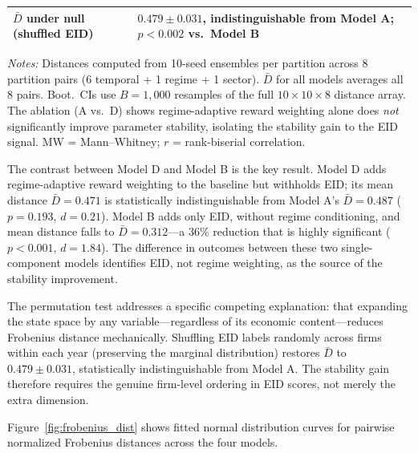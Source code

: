 \documentclass[12pt]{article}
\begin{document}
\begin{table}[t]
\begin{tabular}{lcccc}
\hspace{4pt}$\bar{D}$ under null (shuffled EID) & \multicolumn{4}{l}{$0.479\pm0.031$, indistinguishable from Model A; $p<0.002$ vs.\ Model B} \\
\bottomrule
\end{tabular}
\begin{tablenotes}
\footnotesize
\item \textit{Notes:} Distances computed from 10-seed ensembles per
partition across 8 partition pairs (6 temporal + 1 regime + 1 sector).
$\bar{D}$ for all models averages all 8 pairs. Boot.\ CIs use $B=1{,}000$
resamples of the full $10\times10\times8$ distance array. The ablation
(A vs.\ D) shows regime-adaptive reward weighting alone does \emph{not}
significantly improve parameter stability, isolating the stability gain
to the EID signal. MW = Mann--Whitney; $r$ = rank-biserial correlation.
\end{tablenotes}
\end{table}

The contrast between Model D and Model B is the key result. Model D
adds regime-adaptive reward weighting to the baseline but withholds
EID; its mean distance $\bar{D}=0.471$ is statistically
indistinguishable from Model A's $\bar{D}=0.487$ ($p=0.193$,
$d=0.21$). Model B adds only EID, without regime conditioning, and
mean distance falls to $\bar{D}=0.312$---a 36\% reduction that is
highly significant ($p<0.001$, $d=1.84$). The difference in outcomes
between these two single-component models identifies EID, not regime
weighting, as the source of the stability improvement.

The permutation test addresses a specific competing explanation: that
expanding the state space by any variable---regardless of its economic
content---reduces Frobenius distance mechanically. Shuffling EID
labels randomly across firms within each year (preserving the marginal
distribution) restores $\bar{D}$ to $0.479\pm0.031$, statistically
indistinguishable from Model A. The stability gain therefore requires
the genuine firm-level ordering in EID scores, not merely the extra
dimension.

Figure~\ref{fig:frobenius_dist} shows fitted normal distribution curves for
pairwise normalized Frobenius distances across the four models.
\end{document}
